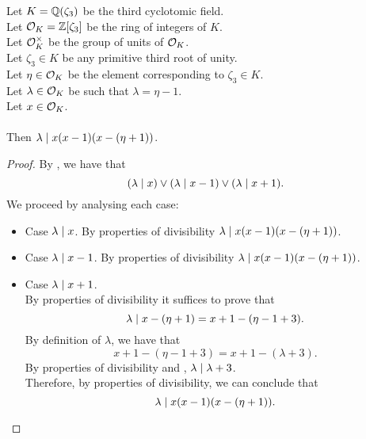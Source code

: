\begin{lemma}
    \label{lmm:lambda_dvd_mul_sub_one_mul_sub_eta_add_one}
    \leanok
    Let $K = \mathbb{Q}(\zeta_3)$ be the third cyclotomic field. \\
    Let $\mathcal{O}_K = \mathbb{Z}[\zeta_3]$ be the ring of integers of $K$. \\
    Let $\mathcal{O}^\times_K$ be the group of units of $\mathcal{O}_K$. \\
    Let $\zeta_3 \in K$ be any primitive third root of unity. \\
    Let $\eta \in \mathcal{O}_K$ be the element corresponding to $\zeta_3 \in K$. \\
    Let $\lambda \in \mathcal{O}_K$ be such that $\lambda = \eta -1$. \\
    Let $x \in \mathcal{O}_K$. \\\\
    Then $\lambda \mid x(x - 1)(x - (\eta + 1))$.
\end{lemma}
\begin{proof}
    \leanok
    By , we have that
    $$(\lambda \mid x) \lor (\lambda \mid x-1) \lor (\lambda \mid x+1).$$
    We proceed by analysing each case:
    \begin{itemize}
        \item Case $\lambda \mid x$. By properties of divisibility
              $\lambda \mid x(x - 1)(x - (\eta + 1))$.
        \item Case $\lambda \mid x-1$. By properties of divisibility
              $\lambda \mid x(x - 1)(x - (\eta + 1))$.
        \item Case $\lambda \mid x+1$.\\
              By properties of divisibility it suffices to prove that
              $$\lambda \mid x - (\eta + 1) = x + 1 - (\eta - 1 + 3).$$
              By definition of $\lambda$, we have that
              $$x + 1 - (\eta - 1 + 3) = x + 1 - (\lambda + 3).$$
              By properties of divisibility and ,
              $\lambda \mid \lambda + 3$.\\
              Therefore, by properties of divisibility, we can conclude that
              $$\lambda \mid x(x - 1)(x - (\eta + 1)).$$
    \end{itemize}
\end{proof}

